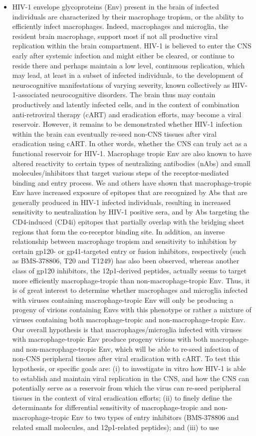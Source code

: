\documentclass[a4paper,11pt]{article}
\makeatletter
\newenvironment{fullwidth}
    {\par
     \setlength{\@totalleftmargin}{0pt}%
     \setlength{\linewidth}{\hsize}%
     \list{}{\setlength{\leftmargin}{0pt}}
     \item\relax}
    {\endlist}
\makeatother
\begin{document}
\begin{enumerate}
\begin{itemize}
\begin{fullwidth}
     HIV-1 envelope glycoproteins (Env) present in the brain of infected individuals are characterized by their macrophage tropism, or the ability to efficiently infect macrophages. Indeed, macrophages and microglia, the resident brain macrophage, support most if not all productive viral replication within the brain compartment. HIV-1 is believed to enter the CNS early after systemic infection and might either be cleared, or continue to reside there and perhaps maintain a low level, continuous replication, which may lead, at least in a subset of infected individuals, to the development of neurocognitive manifestations of varying severity, known collectively as HIV-1-associated neurocognitive disorders. The brain thus may contain productively and latently infected cells, and in the context of combination anti-retroviral therapy (cART) and eradication efforts, may become a viral reservoir. However, it remains to be demonstrated whether HIV-1 infection within the brain can eventually re-seed non-CNS tissues after viral eradication using cART. In other words, whether the CNS can truly act as a functional reservoir for HIV-1. Macrophage tropic Env are also known to have altered reactivity to certain types of neutralizing antibodies (nAbs) and small molecules/inhibitors that target various steps of the receptor-mediated binding and entry process. We and others have shown that macrophage-tropic Env have increased exposure of epitopes that are recognized by Abs that are generally produced in HIV-1 infected individuals, resulting in increased sensitivity to neutralization by HIV-1 positive sera, and by Abs targeting the CD4-induced (CD4i) epitopes that partially overlap with the bridging sheet regions that form the co-receptor binding site. In addition, an inverse relationship between macrophage tropism and sensitivity to inhibition by certain gp120- or gp41-targeted entry or fusion inhibitors, respectively (such as BMS-378806, T20 and T1249) has also been observed, whereas another class of gp120 inhibitors, the 12p1-derived peptides, actually seems to target more efficiently macrophage-tropic than non-macrophage-tropic Env. Thus, it is of great interest to determine whether macrophages and microglia infected with viruses containing macrophage-tropic Env will only be producing a progeny of virions containing Envs with this phenotype or rather a mixture of viruses containing both macrophage-tropic and non-macrophage-tropic Env. Our overall hypothesis is that macrophages/microglia infected with viruses with macrophage-tropic Env produce progeny virions with both macrophage- and non-macrophage-tropic Env, which will be able to re-seed infection of non-CNS peripheral tissues after viral eradication with cART. To test this hypothesis, or specific goals are: (i) to investigate in vitro how HIV-1 is able to establish and maintain viral replication in the CNS, and how the CNS can potentially serve as a reservoir from which the virus can re-seed peripheral tissues in the context of viral eradication efforts; (ii) to finely define the determinants for differential sensitivity of macrophage-tropic and non-macrophage-tropic Env to two types of entry inhibitors (BMS-378806 and related small molecules, and 12p1-related peptides); and (iii) to use 
\end{fullwidth}
\end{itemize}
\end{enumerate}
\end{document}
